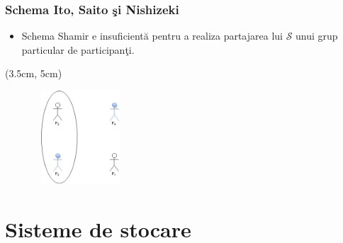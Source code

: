 \documentclass{beamer}
\begin{document}
\begin{frame}
    \frametitle{Schema Ito, Saito \c{s}i Nishizeki}

     {
    \begin{itemize}
        \item Schema Shamir e insuficient\u{a} pentru a realiza partajarea lui $\mathcal{S}$ unui grup particular de participan\c{t}i.
    \end{itemize}
    }
     {
        \begin{textblock*}{4cm}(3.5cm, 5cm)
            \begin{figure}
                \includegraphics[width=3.5cm,height=3.5cm,keepaspectratio]{img/shamir/Ito.png}
           \end{figure}
        \end{textblock*}
    }
\end{frame}

\section{Sisteme de stocare}
\end{document}
